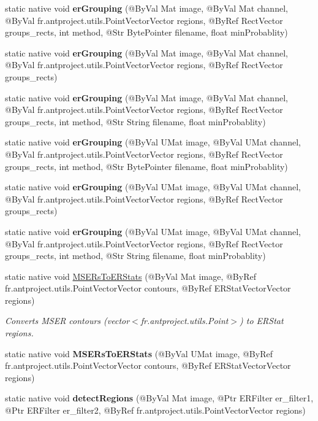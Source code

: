 \begin{DoxyCompactItemize}
\item 
static native void {\bfseries er\+Grouping} (@By\+Val Mat image, @By\+Val Mat channel, @By\+Val fr.antproject.utils.Point\+Vector\+Vector regions, @By\+Ref Rect\+Vector groups\+\_\+rects, int method, @Str Byte\+Pointer filename, float min\+Probablity)
\item 
static native void {\bfseries er\+Grouping} (@By\+Val Mat image, @By\+Val Mat channel, @By\+Val fr.antproject.utils.Point\+Vector\+Vector regions, @By\+Ref Rect\+Vector groups\+\_\+rects)
\item 
static native void {\bfseries er\+Grouping} (@By\+Val Mat image, @By\+Val Mat channel, @By\+Val fr.antproject.utils.Point\+Vector\+Vector regions, @By\+Ref Rect\+Vector groups\+\_\+rects, int method, @Str String filename, float min\+Probablity)
\item 
static native void {\bfseries er\+Grouping} (@By\+Val U\+Mat image, @By\+Val U\+Mat channel, @By\+Val fr.antproject.utils.Point\+Vector\+Vector regions, @By\+Ref Rect\+Vector groups\+\_\+rects, int method, @Str Byte\+Pointer filename, float min\+Probablity)
\item 
static native void {\bfseries er\+Grouping} (@By\+Val U\+Mat image, @By\+Val U\+Mat channel, @By\+Val fr.antproject.utils.Point\+Vector\+Vector regions, @By\+Ref Rect\+Vector groups\+\_\+rects)
\item 
static native void {\bfseries er\+Grouping} (@By\+Val U\+Mat image, @By\+Val U\+Mat channel, @By\+Val fr.antproject.utils.Point\+Vector\+Vector regions, @By\+Ref Rect\+Vector groups\+\_\+rects, int method, @Str String filename, float min\+Probablity)
\item 
static native void \hyperlink{group__text__detect_gad4c72b60ca712eeab78c52b946f649a2}{M\+S\+E\+Rs\+To\+E\+R\+Stats} (@By\+Val Mat image, @By\+Ref fr.antproject.utils.Point\+Vector\+Vector contours, @By\+Ref E\+R\+Stat\+Vector\+Vector regions)
\begin{DoxyCompactList}\small\item\em Converts M\+S\+ER contours (vector$<$fr.antproject.utils.Point$>$) to E\+R\+Stat regions. \end{DoxyCompactList}\item
static native void {\bfseries M\+S\+E\+Rs\+To\+E\+R\+Stats} (@By\+Val U\+Mat image, @By\+Ref fr.antproject.utils.Point\+Vector\+Vector contours, @By\+Ref E\+R\+Stat\+Vector\+Vector regions)
\item 
static native void {\bfseries detect\+Regions} (@By\+Val Mat image, @Ptr E\+R\+Filter er\+\_\+filter1, @Ptr E\+R\+Filter er\+\_\+filter2, @By\+Ref fr.antproject.utils.Point\+Vector\+Vector regions)

\end{DoxyCompactItemize}
